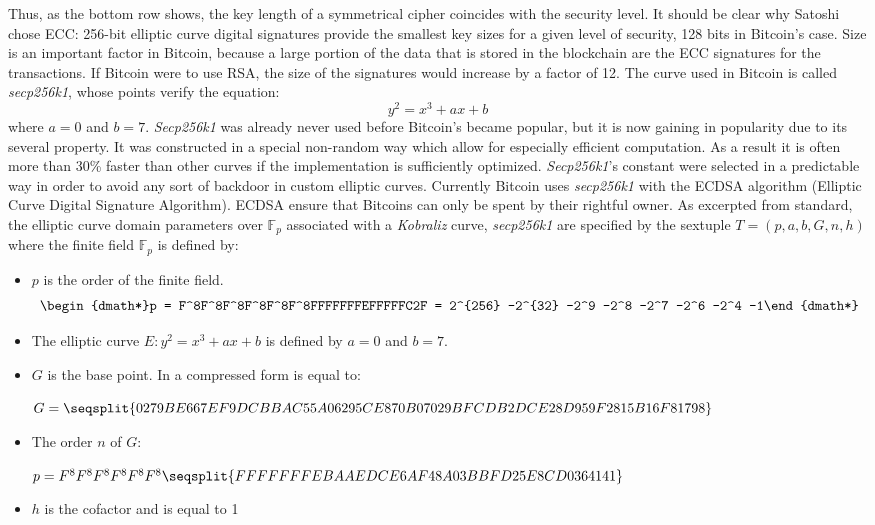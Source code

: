 \documentclass{article}
\begin{document}
\noindent Thus, as the bottom row shows, the key length of a symmetrical cipher coincides with the security level. It should be clear why Satoshi chose ECC: 256-bit elliptic curve digital signatures provide the smallest key sizes for a given level of security, 128 bits in Bitcoin’s case. Size is an important factor in Bitcoin, because a large portion of the data that is stored in the blockchain are the ECC signatures for the transactions. If Bitcoin were to use RSA, the size of the signatures would increase by a factor of 12.\newline
The curve used in Bitcoin is called \textit{secp256k1}, whose points verify the equation:
\[ y^2 = x^3 + ax + b \]
where \(a = 0\) and \(b = 7\).
\textit{Secp256k1} was already never used before Bitcoin’s became popular, but it is now gaining in popularity due to its several property. It was constructed in a special non-random way which allow for especially efficient computation. As a result it is often more than 30\% faster than other curves if the implementation is sufficiently optimized. \textit{Secp256k1}’s constant were selected in a predictable way in order to avoid any sort of backdoor in custom elliptic curves. Currently Bitcoin uses \textit{secp256k1} with the ECDSA algorithm (Elliptic Curve Digital Signature Algorithm). ECDSA ensure that Bitcoins can only be spent by their rightful owner.\newline
As excerpted from standard, the elliptic curve domain parameters over \(\mathbb{F}_{p}\) associated with a \textit{Kobraliz} curve, \textit{secp256k1} are specified by the sextuple \(T = (p, a, b, G, n, h)\) where the finite field \(\mathbb{F}_{p}\) is defined by:
\begin{itemize}
    \item \(p\) is the order of the finite field. \begin{dgroup*}\begin{dmath*}p = F^8F^8F^8F^8F^8F^8FFFFFFFEFFFFFC2F = 2^{256} -2^{32} -2^9 -2^8 -2^7 -2^6 -2^4 -1\end{dmath*}\end{dgroup*}
    \item The elliptic curve \(E:y^2 =x^3+ax+b\) is defined by \(a = 0\) and \(b = 7\).
    \item \(G\) is the base point. In a compressed form is equal to:\par\noindent \(G = \seqsplit{0279BE667EF9DCBBAC55A06295CE870B07029BFCDB2DCE28D959F2815B16F81798}\)
    \item The order \(n\) of \(G\):\par\noindent
    \(p = F^8F^8F^8F^8F^8F^8\seqsplit{FFFFFFFEBAAEDCE6AF48A03BBFD25E8CD0364141}\)
    \item \(h\) is the cofactor and is equal to 1
\end{itemize}
\end{document}
